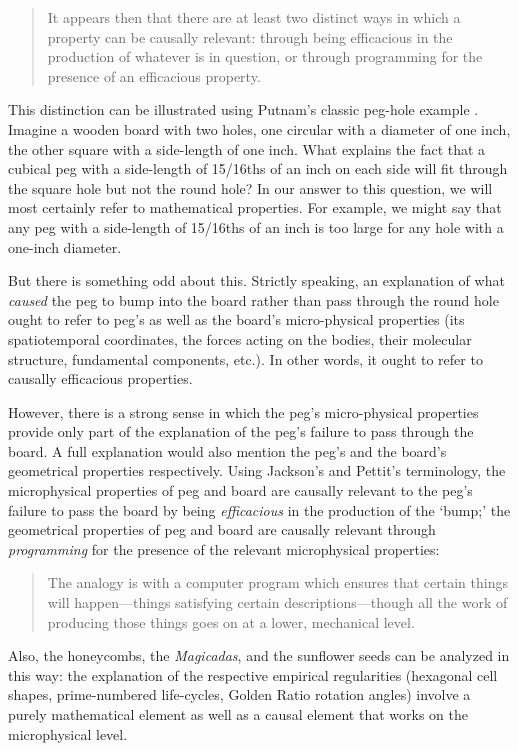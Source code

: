 \documentclass[a4paper,12pt]{article}
\begin{document}
\blockquote{It appears then that there are at least two distinct ways in which a property can be causally relevant: through being efficacious in the production of whatever is in question, or through programming for the presence of an efficacious property. \cite[p.~115]{JacksonPettit1990}}

This distinction can be illustrated using Putnam's classic peg-hole example \cite[pp.~295ff]{Putnam1975}. Imagine a wooden board with two holes, one circular with a diameter of one inch, the other square with a side-length of one inch. What explains the fact that a cubical peg with a side-length of 15/16ths of an inch on each side will fit through the square hole but not the round hole? In our answer to this question, we will most certainly refer to mathematical properties. For example, we might say that any peg with a side-length of 15/16ths of an inch is too large for any hole with a one-inch diameter.

But there is something odd about this. Strictly speaking, an explanation of what \textit{caused} the peg to bump into the board rather than pass through the round hole ought to refer to peg's as well as the board's micro-physical properties (its spatiotemporal coordinates, the forces acting on the bodies, their molecular structure, fundamental components, etc.). In other words, it ought to refer to causally efficacious properties.

However, there is a strong sense in which the peg's micro-physical properties provide only part of the explanation of the peg's failure to pass through the board. A full explanation would also mention the peg's and the board's geometrical properties respectively. Using Jackson's and Pettit's terminology, the microphysical properties of peg and board are causally relevant to the peg's failure to pass the board by being \textit{efficacious} in the production of the `bump;' the geometrical properties of peg and board are causally relevant through \textit{programming} for the presence of the relevant microphysical properties:

\blockquote{The analogy is with a computer program which ensures that certain things will happen---things satisfying certain descriptions---though all the work of producing those things goes on at a lower, mechanical level. \cite[p.~114]{JacksonPettit1990}}

Also, the honeycombs, the \textit{Magicadas}, and the sunflower seeds can be analyzed in this way: the explanation of the respective empirical regularities (hexagonal cell shapes, prime-numbered life-cycles, Golden Ratio rotation angles) involve a purely mathematical element as well as a causal element that works on the microphysical level.
\end{document}
